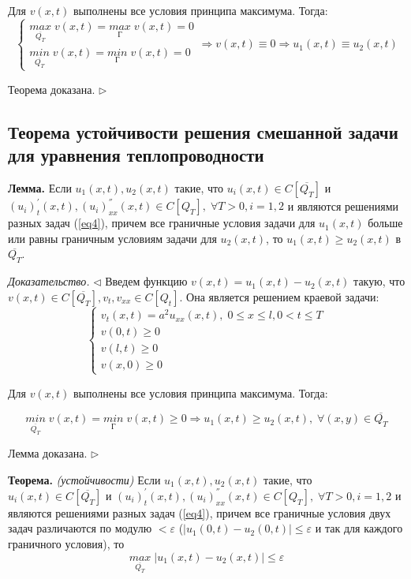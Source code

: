 \documentclass[11pt,a4paper]{article}
\begin{document}
    Для $v(x,t)$ выполнены все условия принципа максимума. Тогда:
    $$
    \begin{cases}
        \underset{\overline{Q_T}}{max} \; v(x,t) = \underset{Г}{max} \; v(x,t) = 0 \\
        \underset{\overline{Q_T}}{min} \; v(x,t) = \underset{Г}{min} \; v(x,t) = 0
    \end{cases}
    \Rightarrow v(x,t) \equiv 0 \Rightarrow u_1(x,t) \equiv u_2(x,t)
    $$
    
    Теорема доказана. $\triangleright$
    
    \subsection{Теорема устойчивости решения смешанной задачи для уравнения теплопроводности}
    \textbf{Лемма.} Если $u_1(x,t),u_2(x,t)$ такие, что $u_i(x,t) \in C[\overline{Q_T}]$ и $(u_i)_{t}^{'}(x,t),(u_i)_{xx}^{''}(x,t) \in C[Q_T], \; \forall T > 0, i = 1,2$ и являются решениями разных задач (\ref{eq4}), причем все граничные условия задачи для $u_1(x,t)$ больше или равны граничным условиям задачи для $u_2(x,t)$, то $u_1(x,t) \geqslant u_2(x,t)$ в $\overline{Q_T}$.
    
    \textit{Доказательство.} $\triangleleft$ Введем функцию $v(x,t) = u_1(x,t) - u_2(x,t)$ такую, что $v(x,t) \in C[\overline{Q_T}], v_t, v_{xx} \in C[Q_t]$. Она является решением краевой задачи:
    $$
    \begin{cases}
        v_t(x,t) = a^2u_{xx}(x,t), \; 0 \leqslant x \leqslant l, 0 < t \leqslant T \\
        v(0, t) \geqslant 0 \\
        v(l, t) \geqslant 0 \\
        v(x, 0) \geqslant 0
    \end{cases}
    $$
    
    Для $v(x,t)$ выполнены все условия принципа максимума. Тогда:
    
    $$
    \underset{\overline{Q_T}}{min} \; v(x,t) = \underset{Г}{min} \; v(x,t) \geqslant 0 \Rightarrow u_1(x,t) \geqslant u_2(x,t), \; \forall (x,y) \in \overline{Q_T}
    $$
    
    Лемма доказана. $\triangleright$
    \par
    \textbf{Теорема.} \textit{(устойчивости)} Если $u_1(x,t),u_2(x,t)$ такие, что $u_i(x,t) \in C[\overline{Q_T}]$ и $(u_i)_{t}^{'}(x,t),(u_i)_{xx}^{''}(x,t) \in C[Q_T], \; \forall T > 0, i = 1,2$ и являются решениями разных задач (\ref{eq4}), причем все граничные условия двух задач различаются по модулю $< \varepsilon$ ($|u_1(0,t) - u_2(0,t)| \leqslant \varepsilon$ и так для каждого граничного условия), то 
    $$
    \underset{\overline{Q_T}}{max} \; |u_1(x,t) - u_2(x,t)| \leqslant \varepsilon
    $$
    
\end{document}
